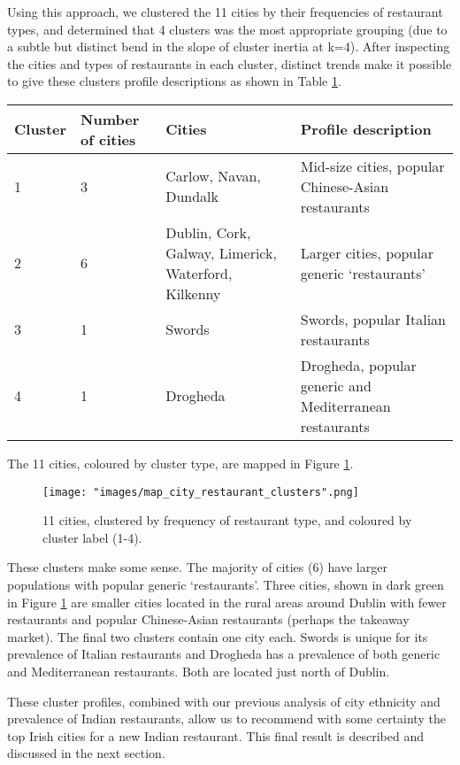 \documentclass[a4paper,11pt]{article}
\begin{document}
Using this approach, we clustered the 11 cities by their frequencies of restaurant types, and determined that 4 clusters was the most appropriate grouping (due to a subtle but distinct bend in the slope of cluster inertia at k=4). After inspecting the cities and types of restaurants in each cluster, distinct trends make it possible to give these clusters profile descriptions as shown in Table \ref{tab:clusters}.  %
%
\begin{table}[]
\label{tab:clusters}
\centering
\begin{tabular}{p{1cm}p{1.5cm}p{3.2cm}p{4.6cm}}
\toprule
Cluster & Number of cities & Cities & Profile description \\ \midrule
1 & 3 & Carlow, Navan, Dundalk & Mid-size cities, popular Chinese-Asian restaurants \\ \midrule
2 & 6 & Dublin, Cork, Galway, Limerick, Waterford, Kilkenny & Larger cities, popular generic `restaurants' \\ \midrule
3 & 1 & Swords & Swords, popular Italian restaurants \\ \midrule
4 & 1 & Drogheda & Drogheda, popular generic and Mediterranean restaurants \\ \bottomrule
\end{tabular}%
\end{table}
%
The 11 cities, coloured by cluster type, are mapped in Figure \ref{fig:city clusters}. 
%
\begin{figure}[htb]
   \centering
   \texttt{[image: "images/map\_city\_restaurant\_clusters".png]}
      \caption{11 cities, clustered by frequency of restaurant type, and coloured by cluster label (1-4).}
      \label{fig:city clusters}
\end{figure}
%
These clusters make some sense. The majority of cities (6) have larger populations with popular generic `restaurants'. Three cities, shown in dark green in Figure \ref{fig:city clusters} are smaller cities located in the rural areas around Dublin with fewer restaurants and popular Chinese-Asian restaurants (perhaps the takeaway market). The final two clusters contain one city each. Swords is unique for its prevalence of Italian restaurants and Drogheda has a prevalence of both generic and Mediterranean restaurants. Both are located just north of Dublin.

These cluster profiles, combined with our previous analysis of city ethnicity and prevalence of Indian restaurants, allow us to recommend with some certainty the top Irish cities for a new Indian restaurant. This final result is described and discussed in the next section.
\end{document}
